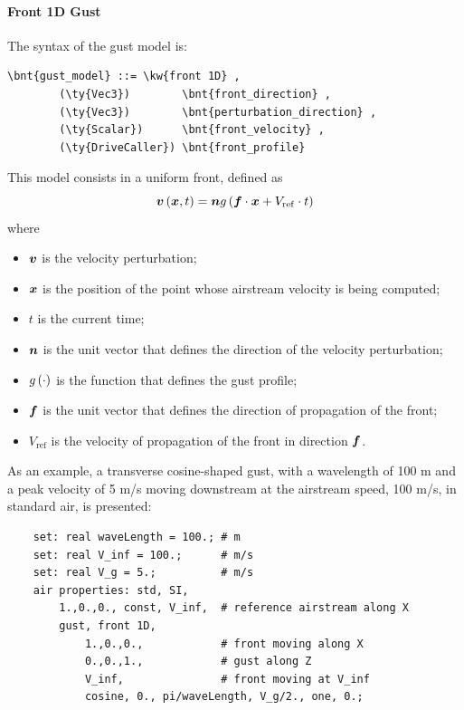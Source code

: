 \paragraph{Front 1D Gust}
The syntax of the  gust model is:
\begin{Verbatim}[commandchars=\\\{\}]
    \bnt{gust_model} ::= \kw{front 1D} ,
        (\ty{Vec3})        \bnt{front_direction} ,
        (\ty{Vec3})        \bnt{perturbation_direction} ,
        (\ty{Scalar})      \bnt{front_velocity} ,
        (\ty{DriveCaller}) \bnt{front_profile}
\end{Verbatim}
This model consists in a uniform front, defined as
\begin{displaymath}
	\boldsymbol{v}\left( \boldsymbol{x}, t \right) = \boldsymbol{n} g\left( \boldsymbol{f} \cdot \boldsymbol{x} + V_\mathrm{ref} \cdot t \right)
\end{displaymath}
where
\begin{itemize}
\item $\boldsymbol{v}$ is the velocity perturbation;
\item $\boldsymbol{x}$ is the position of the point whose airstream velocity
is being computed;
\item $t$ is the current time;
\item $\boldsymbol{n}$ is the unit vector  
that defines the direction of the velocity perturbation;
\item $g\left( \cdot \right)$ is the function  
that defines the gust profile;
\item $\boldsymbol{f}$ is the unit vector  
that defines the direction of propagation of the front;
\item $V_\mathrm{ref}$ is the velocity  
of propagation of the front in direction $\boldsymbol{f}$.
\end{itemize}
As an example, a transverse cosine-shaped gust, with a wavelength of 100 m
and a peak velocity of 5 m/s moving downstream at the airstream speed,
100 m/s, in standard air, is presented:
\begin{verbatim}
    set: real waveLength = 100.; # m
    set: real V_inf = 100.;      # m/s
    set: real V_g = 5.;          # m/s
    air properties: std, SI,
        1.,0.,0., const, V_inf,  # reference airstream along X
        gust, front 1D,
            1.,0.,0.,            # front moving along X
            0.,0.,1.,            # gust along Z
            V_inf,               # front moving at V_inf
            cosine, 0., pi/waveLength, V_g/2., one, 0.;
\end{verbatim}



